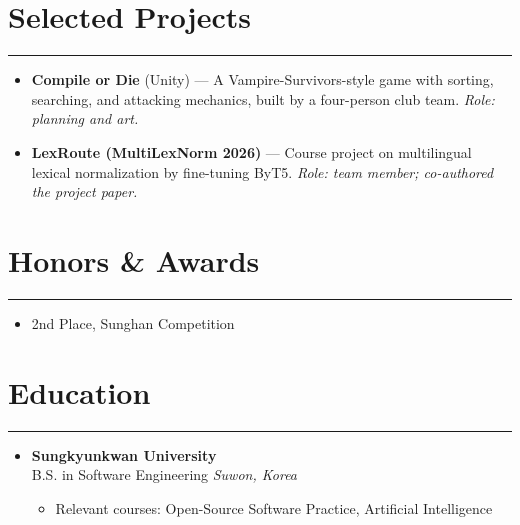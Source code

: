 \documentclass[letterpaper, 10pt]{article}
\begin{document}
\section*{Selected Projects}
\hrule
\vspace{4pt}
\begin{itemize}
    \item \textbf{Compile or Die} (Unity) --- A Vampire-Survivors-style game with sorting, searching, and attacking mechanics, built by a four-person club team. \textit{Role: planning and art.}
    \item \textbf{LexRoute (MultiLexNorm 2026)} --- Course project on multilingual lexical normalization by fine-tuning ByT5. \textit{Role: team member; co-authored the project paper.}
\end{itemize}

\section*{Honors \& Awards}
\hrule
\vspace{4pt}
\begin{itemize}
    \item 2nd Place, Sunghan Competition
\end{itemize}

\section*{Education}
\hrule
\vspace{4pt}
\begin{itemize}
    \item[] \textbf{Sungkyunkwan University} \hfill  \\
        B.S. in Software Engineering \hfill \textit{Suwon, Korea}
        \begin{itemize}
            \item Relevant courses: Open-Source Software Practice, Artificial Intelligence
        \end{itemize}
\end{itemize}

\end{document}
